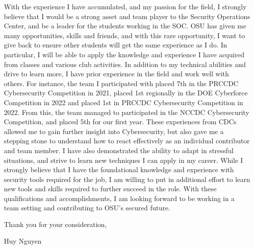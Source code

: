 \documentclass[11pt]{article} %
\begin{document}
With the experience I have accumulated, and my passion for the field, I strongly believe that I would be a strong asset and 
team player to the Security Operations Center, and be a leader for the students working in the SOC. OSU has given me many opportunities,
skills and friends, and with this rare opportunity, I want to give back to ensure other students will get the same experience as I do. 
In particular, I will be able to apply the knowledge and experience I have acquired from classes and various club activities. 
In addition to my technical abilities and drive to learn more, I have prior experience in the field and work well with others. 
For instance, the team I participated with placed 7th in the PRCCDC Cybersecurity Competition in 2021, placed 1st regionally in the DOE 
Cyberforce Competition in 2022 and placed 1st in PRCCDC Cybersecurity Competition in 2022. From this, the team managed to
participated in the NCCDC Cybersecurity Competition, and placed 5th for our first year. These experiences from CDCs allowed me 
to gain further insight into Cybersecurity, but also gave me a stepping stone to understand how to react effectively as an 
individual contributor and team member. I have also demonstrated the ability to adapt in stressful situations, and strive to 
learn new techniques I can apply in my career. While I strongly believe that I have the foundational knowledge and experience 
with security tools required for the job, I am willing to put in additional effort to learn new tools and skills required to 
further succeed in the role. With these qualifications and accomplishments, I am looking forward to be working in 
a team setting and contributing to OSU's secured future. 

Thank you for your consideration,
	
Huy Nguyen

\end{document}
